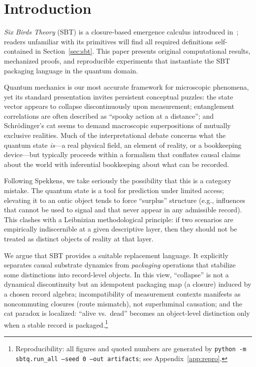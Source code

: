 \documentclass[11pt]{article}
\begin{document}
\section{Introduction}

\emph{Six Birds Theory} (SBT) is a closure-based emergence calculus introduced in~\cite{Tsiokos2026SixBirds}; readers unfamiliar with its primitives will find all required definitions self-contained in Section~\ref{sec:sbt}. This paper presents original computational results, mechanized proofs, and reproducible experiments that instantiate the SBT packaging language in the quantum domain.

Quantum mechanics is our most accurate framework for microscopic phenomena, yet its standard presentation invites persistent conceptual puzzles: the state vector appears to collapse discontinuously upon measurement; entanglement correlations are often described as ``spooky action at a distance''; and Schr\"odinger's cat seems to demand macroscopic superpositions of mutually exclusive realities. Much of the interpretational debate concerns what the quantum state \emph{is}---a real physical field, an element of reality, or a bookkeeping device---but typically proceeds within a formalism that conflates causal claims about the world with inferential bookkeeping about what can be recorded.

Following Spekkens, we take seriously the possibility that this is a category mistake.\cite{Spekkens2007Toy} The quantum state is a tool for prediction under limited access; elevating it to an ontic object tends to force ``surplus'' structure (e.g., influences that cannot be used to signal and that never appear in any admissible record). This clashes with a Leibnizian methodological principle: if two scenarios are empirically indiscernible at a given descriptive layer, then they should not be treated as distinct objects of reality at that layer.

We argue that SBT provides a suitable replacement language.\cite{Tsiokos2026SixBirds} It explicitly separates causal substrate dynamics from \emph{packaging} operations that stabilize some distinctions into record-level objects. In this view, ``collapse'' is not a dynamical discontinuity but an idempotent packaging map (a closure) induced by a chosen record algebra; incompatibility of measurement contexts manifests as noncommuting closures (route mismatch), not superluminal causation; and the cat paradox is localized: ``alive vs.\ dead'' becomes an object-level distinction only when a stable record is packaged.\footnote{Reproducibility: all figures and quoted numbers are generated by \texttt{python -m sbtq.run\_all --seed 0 --out artifacts}; see Appendix~\ref{app:repro}.}
\end{document}
